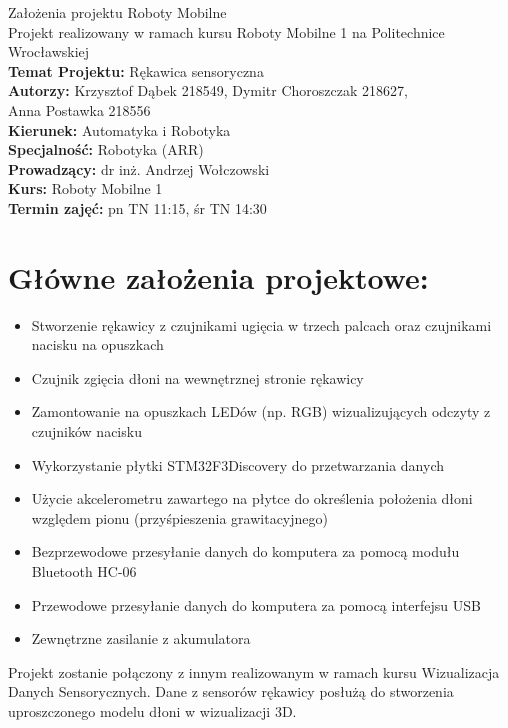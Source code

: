 \documentclass[12pt,a4paper]{article}
\begin{document}
\LARGE\centering Założenia projektu Roboty Mobilne\\
\large\centering Projekt realizowany w ramach kursu Roboty Mobilne 1 na Politechnice Wrocławskiej\\
\vspace{5 mm}
\normalsize\flushleft\textbf{Temat Projektu:} Rękawica sensoryczna\\
\textbf{Autorzy:} Krzysztof Dąbek 218549, Dymitr Choroszczak 218627,\\Anna Postawka 218556\\
\textbf{Kierunek:} Automatyka i Robotyka\\
\textbf{Specjalność:} Robotyka (ARR)\\
\textbf{Prowadzący:} dr inż. Andrzej Wołczowski\\
\textbf{Kurs:} Roboty Mobilne 1\\
\textbf{Termin zajęć:} pn TN 11:15, śr TN 14:30\\
\vspace{5 mm}
\section{Główne założenia projektowe: }\normalsize
\begin{itemize}
\item Stworzenie rękawicy z czujnikami ugięcia w trzech palcach oraz czujnikami nacisku na opuszkach
\item Czujnik zgięcia dłoni na wewnętrznej stronie rękawicy
\item Zamontowanie na opuszkach LEDów (np. RGB) wizualizujących odczyty z czujników nacisku
\item Wykorzystanie płytki STM32F3Discovery do przetwarzania danych
\item Użycie akcelerometru zawartego na płytce do określenia położenia dłoni względem pionu (przyśpieszenia grawitacyjnego)
\item Bezprzewodowe przesyłanie danych do komputera za pomocą modułu Bluetooth HC-06
\item Przewodowe przesyłanie danych do komputera za pomocą interfejsu USB
\item Zewnętrzne zasilanie z akumulatora
\end{itemize}
Projekt zostanie połączony z innym realizowanym w ramach kursu Wizualizacja Danych Sensorycznych. Dane z sensorów rękawicy posłużą do stworzenia uproszczonego modelu dłoni w wizualizacji 3D.
\end{document}
